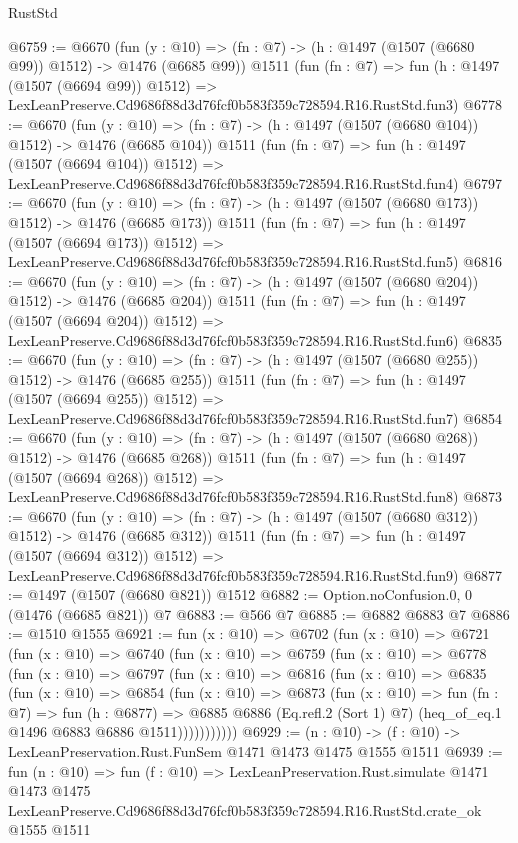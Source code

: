 \begin{lexlean}{RustStd}
\begin{coremodule}
@6759 := @6670
    (fun (y : @10) => (fn : @7) -> (h : @1497 (@1507 (@6680 @99)) @1512) -> @1476 (@6685 @99))
    @1511
    (fun (fn : @7) =>
    fun (h : @1497 (@1507 (@6694 @99)) @1512) =>
    LexLeanPreserve.Cd9686f88d3d76fcf0b583f359c728594.R16.RustStd.fun3)
@6778 := @6670
    (fun (y : @10) => (fn : @7) -> (h : @1497 (@1507 (@6680 @104)) @1512) -> @1476 (@6685 @104))
    @1511
    (fun (fn : @7) =>
    fun (h : @1497 (@1507 (@6694 @104)) @1512) =>
    LexLeanPreserve.Cd9686f88d3d76fcf0b583f359c728594.R16.RustStd.fun4)
@6797 := @6670
    (fun (y : @10) => (fn : @7) -> (h : @1497 (@1507 (@6680 @173)) @1512) -> @1476 (@6685 @173))
    @1511
    (fun (fn : @7) =>
    fun (h : @1497 (@1507 (@6694 @173)) @1512) =>
    LexLeanPreserve.Cd9686f88d3d76fcf0b583f359c728594.R16.RustStd.fun5)
@6816 := @6670
    (fun (y : @10) => (fn : @7) -> (h : @1497 (@1507 (@6680 @204)) @1512) -> @1476 (@6685 @204))
    @1511
    (fun (fn : @7) =>
    fun (h : @1497 (@1507 (@6694 @204)) @1512) =>
    LexLeanPreserve.Cd9686f88d3d76fcf0b583f359c728594.R16.RustStd.fun6)
@6835 := @6670
    (fun (y : @10) => (fn : @7) -> (h : @1497 (@1507 (@6680 @255)) @1512) -> @1476 (@6685 @255))
    @1511
    (fun (fn : @7) =>
    fun (h : @1497 (@1507 (@6694 @255)) @1512) =>
    LexLeanPreserve.Cd9686f88d3d76fcf0b583f359c728594.R16.RustStd.fun7)
@6854 := @6670
    (fun (y : @10) => (fn : @7) -> (h : @1497 (@1507 (@6680 @268)) @1512) -> @1476 (@6685 @268))
    @1511
    (fun (fn : @7) =>
    fun (h : @1497 (@1507 (@6694 @268)) @1512) =>
    LexLeanPreserve.Cd9686f88d3d76fcf0b583f359c728594.R16.RustStd.fun8)
@6873 := @6670
    (fun (y : @10) => (fn : @7) -> (h : @1497 (@1507 (@6680 @312)) @1512) -> @1476 (@6685 @312))
    @1511
    (fun (fn : @7) =>
    fun (h : @1497 (@1507 (@6694 @312)) @1512) =>
    LexLeanPreserve.Cd9686f88d3d76fcf0b583f359c728594.R16.RustStd.fun9)
@6877 := @1497 (@1507 (@6680 @821)) @1512
@6882 := Option.noConfusion.{0, 0} (@1476 (@6685 @821)) @7
@6883 := @566 @7
@6885 := @6882 @6883 @7
@6886 := @1510 @1555
@6921 := fun (x : @10) =>
  @6702
    (fun (x : @10) =>
    @6721
      (fun (x : @10) =>
      @6740
        (fun (x : @10) =>
        @6759
          (fun (x : @10) =>
          @6778
            (fun (x : @10) =>
            @6797
              (fun (x : @10) =>
              @6816
                (fun (x : @10) =>
                @6835
                  (fun (x : @10) =>
                  @6854
                    (fun (x : @10) =>
                    @6873
                      (fun (x : @10) =>
                      fun (fn : @7) =>
                      fun (h : @6877) =>
                      @6885
                        @6886
                        (Eq.refl.{2} (Sort 1) @7)
                        (heq_of_eq.{1} @1496 @6883 @6886 @1511)))))))))))
@6929 := (n : @10) -> (f : @10) -> LexLeanPreservation.Rust.FunSem @1471 @1473 @1475 @1555 @1511
@6939 := fun (n : @10) =>
  fun (f : @10) =>
  LexLeanPreservation.Rust.simulate
    @1471
    @1473
    @1475
    LexLeanPreserve.Cd9686f88d3d76fcf0b583f359c728594.R16.RustStd.crate_ok
    @1555
    @1511
\end{coremodule}
\end{lexlean}
